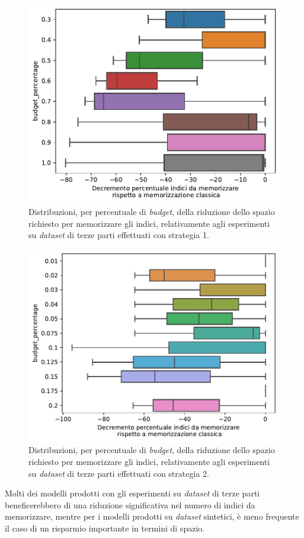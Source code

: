 \begin{figure}
    \centering
    \includegraphics[width=.7\linewidth]{img/decremento_spazio_indici_TP_old.pdf}
    \caption{Distribuzioni, per percentuale di \emph{budget}, della riduzione dello spazio richiesto per memorizzare gli indici, relativamente agli esperimenti su \emph{dataset} di terze parti effettuati con strategia 1.}
    \label{fig:dist_riduzione_TP_old}
\end{figure}%
\begin{figure}
    \centering
    \includegraphics[width=.7\linewidth]{img/decremento_spazio_indici_TP_new.pdf}
    \caption{Distribuzioni, per percentuale di \emph{budget}, della riduzione dello spazio richiesto per memorizzare gli indici, relativamente agli esperimenti su \emph{dataset} di terze parti effettuati con strategia 2.}
    \label{fig:dist_riduzione_TP_new}
\end{figure}
Molti dei modelli prodotti con gli esperimenti su \emph{dataset} di terze parti beneficerebbero di una riduzione significativa nel numero di indici da memorizzare, mentre per i modelli prodotti su \emph{dataset} sintetici, è meno frequente il caso di un risparmio importante in termini di spazio.
